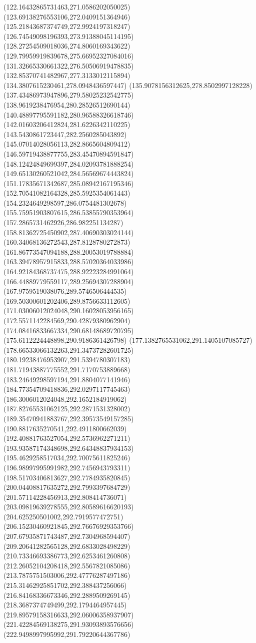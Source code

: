 {(122.16432865731463,271.0586202050025)
(123.69138276553106,272.0409151364946)
(125.21843687374749,272.9924197318247)
(126.74549098196393,273.91388045114195)
(128.27254509018036,274.8060169343622)
(129.79959919839678,275.66952327084016)
(131.32665330661322,276.50506919478835)
(132.85370741482967,277.3133012115894)
(134.3807615230461,278.0948436597447)
(135.9078156312625,278.8502997128228)
(137.43486973947896,279.58025232542775)
(138.9619238476954,280.28526512690144)
(140.48897795591182,280.96588326618746)
(142.01603206412824,281.6226342110225)
(143.5430861723447,282.2560285043892)
(145.07014028056113,282.8665604809412)
(146.59719438877755,283.45470894591847)
(148.12424849699397,284.02093781888254)
(149.65130260521042,284.56569674443824)
(151.17835671342687,285.08942167195346)
(152.70541082164328,285.5925354061443)
(154.2324649298597,286.0754481302678)
(155.75951903807615,286.53855790353964)
(157.2865731462926,286.982251134287)
(158.81362725450902,287.40690303024144)
(160.34068136272543,287.8128780272873)
(161.86773547094188,288.20053019788884)
(163.39478957915833,288.57020364033986)
(164.92184368737475,288.92223284991064)
(166.44889779559117,289.25694307288904)
(167.9759519038076,289.5746506444535)
(169.50300601202406,289.8756633112605)
(171.03006012024048,290.16028053956165)
(172.5571142284569,290.42879380962904)
(174.08416833667334,290.68148689720795)
(175.6112224448898,290.9186361426798)
(177.1382765531062,291.1405107085727)
(178.66533066132263,291.34737282601725)
(180.19238476953907,291.5394780307183)
(181.71943887775552,291.7170753889668)
(183.24649298597194,291.8804077141946)
(184.77354709418836,292.0297117745463)
(186.3006012024048,292.1652184919062)
(187.82765531062125,292.2871531328002)
(189.35470941883767,292.39573549157285)
(190.8817635270541,292.4911800662039)
(192.40881763527054,292.5736962271211)
(193.93587174348698,292.64348837934153)
(195.4629258517034,292.70075611825246)
(196.98997995991982,292.7456943793311)
(198.51703406813627,292.7784935820845)
(200.04408817635272,292.7993397684729)
(201.57114228456913,292.808414736071)
(203.09819639278555,292.80589616620193)
(204.625250501002,292.7919577472751)
(206.15230460921845,292.76676929353766)
(207.67935871743487,292.7304968594407)
(209.20641282565128,292.6833028498229)
(210.73346693386773,292.6253461260808)
(212.26052104208418,292.5567821085086)
(213.7875751503006,292.47776287497186)
(215.31462925851702,292.388437256066)
(216.84168336673346,292.2889509269145)
(218.3687374749499,292.1794464957445)
(219.89579158316633,292.06006358937907)
(221.42284569138275,291.93093893576656)
(222.9498997995992,291.79220644367786)
}
